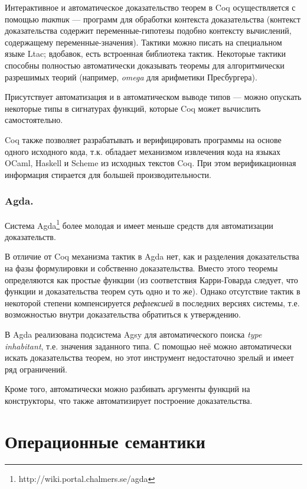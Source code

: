      Интерактивное и автоматическое доказательство теорем в Coq осуществляется с помощью \emph{тактик} --- программ для обработки контекста доказательства (контекст доказательства содержит переменные-гипотезы подобно контексту вычислений, содержащему переменные-значения). Тактики можно писать на специальном языке Ltac; вдобавок, есть встроенная библиотека тактик. Некоторые тактики способны полностью автоматически доказывать теоремы для алгоритмически разрешимых теорий (например, \emph{omega} для арифметики Пресбургера).

     Присутствует автоматизация и в автоматическом выводе типов --- можно опускать некоторые типы в сигнатурах функций, которые Coq может вычислить самостоятельно.

     Coq также позволяет разрабатывать и верифицировать программы на основе одного исходного кода, т.к. обладает механизмом извлечения кода на языках OCaml, Haskell и Scheme из исходных текстов Coq. При этом верификационная информация стирается для большей производительности.

  \subsubsection{Agda.}

     Система Agda\footnote{http://wiki.portal.chalmers.se/agda} более молодая и имеет меньше средств для автоматизации доказательств.

     В отличие от Coq механизма тактик в Agda нет, как и разделения доказательства на фазы формулировки и собственно доказательства. Вместо этого теоремы определяются как простые функции (из соответствия Карри-Говарда следует, что функции и доказательства теорем суть одно и то же). Однако отсутствие тактик в некоторой степени компенсируется \emph{рефлексией} в последних версиях системы, т.е. возможностью внутри доказательства обратиться к утверждению.

     В Agda реализована подсистема Agsy для автоматического поиска \emph{type inhabitant}, т.е. значения заданного типа. С помощью неё можно автоматически искать доказательства теорем, но этот инструмент недостаточно зрелый и имеет ряд ограничений.

     Кроме того, автоматически можно разбивать аргументы функций на конструкторы, что также автоматизирует построение доказательства.

  \section{Операционные семантики}

